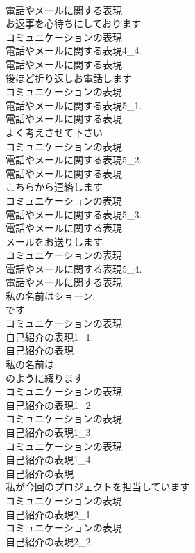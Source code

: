 \documentclass[8pt]{extreport}
\begin{document}
\begin{CJK}{UTF8}{min}
\\	電話やメールに関する表現
\\	お返事を心待ちにしております	
\\	コミュニケーションの表現
\\	電話やメールに関する表現4_4.
\\	電話やメールに関する表現
\\	後ほど折り返しお電話します	
\\	コミュニケーションの表現
\\	電話やメールに関する表現5_1.
\\	電話やメールに関する表現
\\	よく考えさせて下さい	
\\	コミュニケーションの表現
\\	電話やメールに関する表現5_2.
\\	電話やメールに関する表現
\\	こちらから連絡します	
\\	コミュニケーションの表現
\\	電話やメールに関する表現5_3.
\\	電話やメールに関する表現
\\	メールをお送りします	
\\	コミュニケーションの表現
\\	電話やメールに関する表現5_4.
\\	電話やメールに関する表現
\\	私の名前はショーン,
\\	です	
\\	コミュニケーションの表現
\\	自己紹介の表現1_1.
\\	自己紹介の表現
\\	私の名前は
\\	のように綴ります	
\\	コミュニケーションの表現
\\	自己紹介の表現1_2.
\\	コミュニケーションの表現
\\	自己紹介の表現1_3.
\\	コミュニケーションの表現
\\	自己紹介の表現1_4.
\\	自己紹介の表現
\\	私が今回のプロジェクトを担当しています	
\\	コミュニケーションの表現
\\	自己紹介の表現2_1.
\\	コミュニケーションの表現
\\	自己紹介の表現2_2.

\end{CJK}
\end{document}
